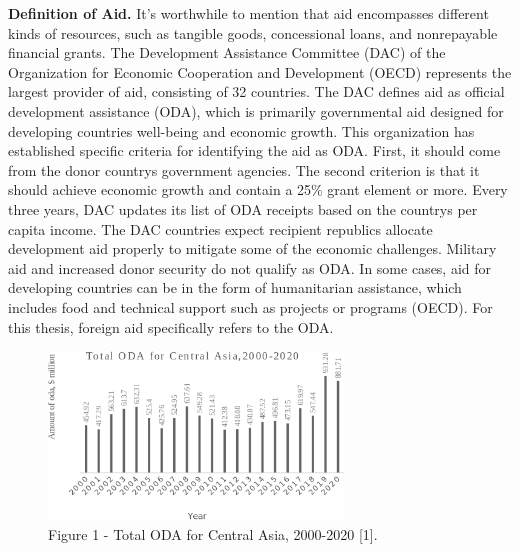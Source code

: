 \begin{multicols}{2}
{\bfseries Definition of Aid.} It's worthwhile to mention that aid
encompasses different kinds of resources, such as tangible goods,
concessional loans, and nonrepayable financial grants. The Development
Assistance Committee (DAC) of the Organization for Economic Cooperation
and Development (OECD) represents the largest provider of aid,
consisting of 32 countries. The DAC defines aid as official development
assistance (ODA), which is primarily governmental aid designed for
developing countries\textquotesingle{} well-being and economic growth.
This organization has established specific criteria for identifying the
aid as ODA. First, it should come from the donor
country\textquotesingle s government agencies. The second criterion is
that it should achieve economic growth and contain a 25\% grant element
or more. Every three years, DAC updates its list of ODA receipts based
on the country\textquotesingle s per capita income. The DAC countries
expect recipient republics allocate development aid properly to mitigate
some of the economic challenges. Military aid and increased donor
security do not qualify as ODA. In some cases, aid for developing
countries can be in the form of humanitarian assistance, which includes
food and technical support such as projects or programs (OECD). For this
thesis, foreign aid specifically refers to the ODA.
\end{multicols}

\begin{figure}[H]
	\centering
	\includegraphics[width=0.7\textwidth]{assets/341}
	\caption*{Figure 1 - Total ODA for Central Asia, 2000-2020 {[}1{]}.}
\end{figure}

